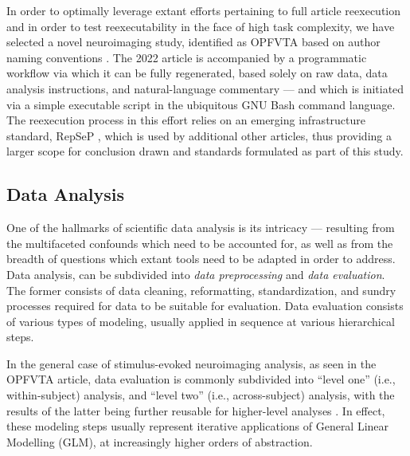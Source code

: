 In order to optimally leverage extant efforts pertaining to full article reexecution and in order to test reexecutability in the face of high task complexity, we have selected a novel neuroimaging study, identified as OPFVTA based on author naming conventions \supercite{opfvta}.
The 2022 article is accompanied by a programmatic workflow via which it can be fully regenerated, based solely on raw data, data analysis instructions, and natural-language commentary — and which is initiated via a simple executable script in the ubiquitous GNU Bash \supercite{bash} command language.
The reexecution process in this effort relies on an emerging infrastructure standard, RepSeP \supercite{repsep}, which is used by additional other articles, thus providing a larger scope for conclusion drawn and standards formulated as part of this study.


\subsection{Data Analysis}

One of the hallmarks of scientific data analysis is its intricacy — resulting from the multifaceted confounds which need to be accounted for, as well as from the breadth of questions which extant tools need to be adapted in order to address.
Data analysis, can be subdivided into \emph{data preprocessing} and \emph{data evaluation}.
The former consists of data cleaning, reformatting, standardization, and sundry processes required for data to be suitable for evaluation.
Data evaluation consists of various types of modeling, usually applied in sequence at various hierarchical steps.

In the general case of stimulus-evoked neuroimaging analysis, as seen in the OPFVTA article, data evaluation is commonly subdivided into “level one” (i.e., within-subject) analysis, and “level two” (i.e., across-subject) analysis, with the results of the latter being further reusable for higher-level analyses \supercite{Friston1995}.
In effect, these modeling steps usually represent iterative applications of General Linear Modelling (GLM), at increasingly higher orders of abstraction.

